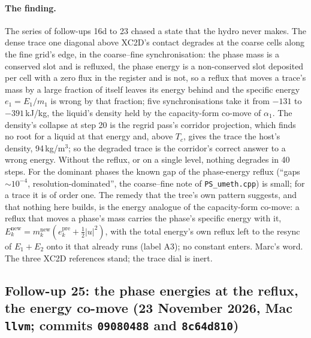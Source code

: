 \documentclass[11pt,a4paper]{article}
\newcommand{\code}[1]{\texttt{\small #1}}
\begin{document}
\paragraph{The finding.}  The series of follow-ups 16d to 23 chased a
state that the hydro never makes.  The dense trace one diagonal above
XC2D's contact degrades at the coarse cells along the fine grid's edge,
in the coarse--fine synchronisation: the phase mass is a conserved slot
and is refluxed, the phase energy is a non-conserved slot deposited per
cell with a zero flux in the register and is not, so a reflux that moves
a trace's mass by a large fraction of itself leaves its energy behind
and the specific energy $e_1 = E_1/m_1$ is wrong by that fraction; five
synchronisations take it from $-131$ to $-391$\,kJ/kg, the liquid's
density held by the capacity-form co-move of $\alpha_1$.  The density's
collapse at step 20 is the regrid pass's corridor projection, which
finds no root for a liquid at that energy and, above $T_c$, gives the
trace the host's density, 94\,kg/m$^3$; so the degraded trace is the
corridor's correct answer to a wrong energy.  Without the reflux, or on a
single level, nothing degrades in 40 steps.  For the dominant phases
the known gap of the phase-energy reflux (``gaps $\sim 10^{-4}$,
resolution-dominated'', the coarse--fine note of \code{PS\_umeth.cpp})
is small; for a trace it is of order one.  The remedy that the tree's
own pattern suggests, and that nothing here builds, is the energy
analogue of the capacity-form co-move: a reflux that moves a phase's
mass carries the phase's specific energy with it,
$E_k^{\mathrm{new}} = m_k^{\mathrm{new}} (e_k^{\mathrm{pre}} + \tfrac12 |u|^2)$,
with the total energy's own reflux left to the resync of $E_1 + E_2$
onto it that already runs (label A3); no constant enters.  Marc's
word.  The three XC2D references stand; the trace dial is inert.


\subsection{Follow-up 25: the phase energies at the reflux, the energy co-move (23 November 2026, Mac \code{llvm}; commits \code{09080488} and \code{8c64d810})}
\end{document}
